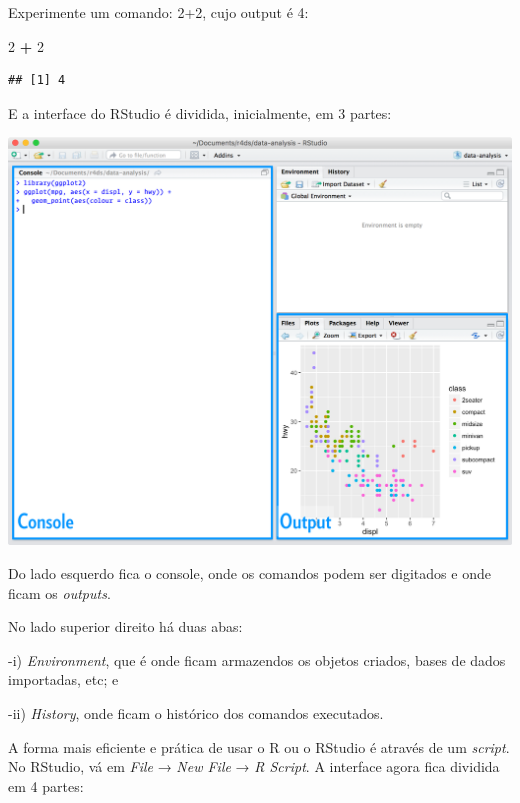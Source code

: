 \documentclass[a4paper]{book}
\newenvironment{Shaded}{\begin{snugshade}}{\end{snugshade}}
\newcommand{\DecValTok}[1]{\textcolor[rgb]{0.00,0.00,0.81}{#1}}
\newcommand{\OperatorTok}[1]{\textcolor[rgb]{0.81,0.36,0.00}{\textbf{#1}}}
\newcommand{\StringTok}[1]{\textcolor[rgb]{0.31,0.60,0.02}{#1}}
\begin{document}
Experimente um comando: 2+2, cujo output é 4:

\begin{Shaded}
\begin{Highlighting}[]
\DecValTok{2} \OperatorTok{+}\StringTok{ }\DecValTok{2}
\end{Highlighting}
\end{Shaded}

\begin{verbatim}
## [1] 4
\end{verbatim}

E a interface do RStudio é dividida, inicialmente, em 3 partes:

\begin{center}\includegraphics[width=0.9\linewidth]{imagens/rstudio-console} \end{center}

Do lado esquerdo fica o console, onde os comandos podem ser digitados e onde ficam os \emph{outputs}.

No lado superior direito há duas abas:

-i) \emph{Environment}, que é onde ficam armazendos os objetos criados, bases de dados importadas, etc; e

-ii) \emph{History}, onde ficam o histórico dos comandos executados.

A forma mais eficiente e prática de usar o R ou o RStudio é através de um \emph{script}. No RStudio, vá em \emph{File} → \emph{New File} → \emph{R Script}. A interface agora fica dividida em 4 partes:
\end{document}
